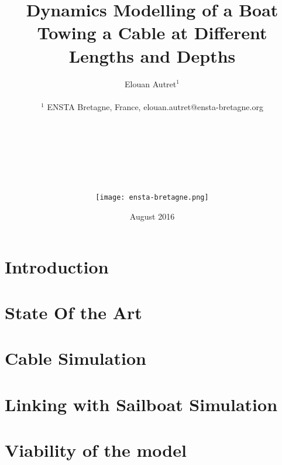 \documentclass[twoside,12pt]{report} %
\title{ Dynamics Modelling of a Boat Towing a Cable at Different Lengths and Depths }
\author{Elouan Autret$^{1}$\\
\\
\normalsize{$^{1}$ ENSTA Bretagne, France, elouan.autret@ensta-bretagne.org}\\\\\\\\\\\\\\\\
\texttt{[image: ensta-bretagne.png]}
}
\date{August 2016}
\begin{document}
\renewcommand{\contentsname}{Contents}	%
\renewcommand{\bibname}{Bibliography}	%




\tableofcontents  %

\listoffigures  %
\listoftables   %

{
\printglossaries
{}
}
\chapter*{Introduction}


\chapter{State Of the Art}

\chapter{Cable Simulation}


\chapter{Linking with Sailboat Simulation}


\chapter{Viability of the model}

\end{document}
